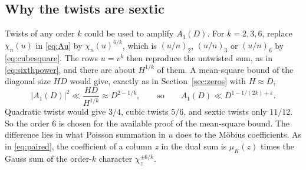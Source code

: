 \documentclass[11pt]{article}
\newcommand{\muk}{\mu_K}
\numberwithin{equation}{section}
\begin{document}
\subsection{Why the twists are sextic}\label{sec:whysextic}
Twists of any order $k$ could be used to amplify $A_1(D)$. For $k=2,3,6$, replace
$\chi_n(u)$ in \eqref{eq:Au} by $\chi_n(u)^{6/k}$, which is $(u/n)_2$, $(u/n)_3$ or $(u/n)_6$ by
\eqref{eq:cubesquare}. The rows $u=v^k$ then reproduce the untwisted sum, as in \eqref{eq:sixthpower},
and there are about $H^{1/k}$ of them. A mean-square bound of the diagonal size $HD$ would give,
exactly as in Section~\ref{sec:zeros} with $H\approx D$,
\begin{equation}\label{eq:orderk}
 |A_1(D)|^2\ll\frac{HD}{H^{1/k}}\approx D^{2-1/k},\qquad\text{so}\qquad A_1(D)\ll D^{1-1/(2k)+\varepsilon}.
\end{equation}
Quadratic twists would give $3/4$, cubic twists $5/6$, and sextic twists only $11/12$. So the order $6$
is chosen for the available proof of the mean-square bound. The difference
lies in what Poisson summation in $u$ does to the M\"obius coefficients. As in \eqref{eq:paired}, the
coefficient of a column $z$ in the dual sum is $\muk(z)$ times the Gauss sum of the order-$k$ character
$\chi_z^{\pm6/k}$.
\end{document}
